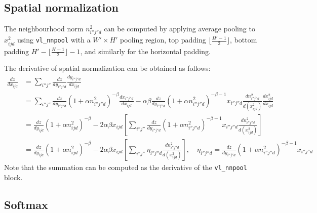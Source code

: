 \subsection{Spatial normalization}\label{s:impl-spnorm}

The neighbourhood norm $n^2_{i''j''d}$ can be computed by applying average pooling to $x_{ijd}^2$ using \verb!vl_nnpool! with a $W'\times H'$ pooling region, top padding $\lfloor \frac{H'-1}{2}\rfloor$, bottom padding $H'-\lfloor \frac{H-1}{2}\rfloor-1$, and similarly for the horizontal padding.

The derivative of spatial normalization can be obtained as follows:
\begin{align*}
\frac{dz}{dx_{ijd}} 
&= \sum_{i''j''}
\frac{dz}{d y_{i''j''d}} 
\frac{d y_{i''j''d}}{d x_{ijd}}
\\
&=
\sum_{i''j''}
\frac{dz}{d y_{i''j''d}} 
(1 + \alpha n_{i''j''d}^2)^{-\beta}
\frac{dx_{i''j''d}}{d x_{ijd}} 
-\alpha\beta
\frac{dz}{d y_{i''j''d}} 
(1 + \alpha n_{i''j''d}^2)^{-\beta-1}
x_{i''j''d}
\frac{dn_{i''j''d}^2}{d (x^2_{ijd})} 
\frac{dx^2_{ijd}}{d x_{ijd}}
\\
&=
\frac{dz}{d y_{ijd}} 
(1 + \alpha n_{ijd}^2)^{-\beta}
-2\alpha\beta x_{ijd}
\left[
\sum_{i''j''}
\frac{dz}{d y_{i''j''d}} 
(1 + \alpha n_{i''j''d}^2)^{-\beta-1}
x_{i''j''d}
\frac{dn_{i''j''d}^2}{d (x_{ijd}^2)}
\right]
\\
&=
\frac{dz}{d y_{ijd}} 
(1 + \alpha n_{ijd}^2)^{-\beta}
-2\alpha\beta x_{ijd}
\left[
\sum_{i''j''}
\eta_{i''j''d}
\frac{dn_{i''j''d}^2}{d (x_{ijd}^2)}
\right],
\quad
\eta_{i''j''d}=
\frac{dz}{d y_{i''j''d}} 
(1 + \alpha n_{i''j''d}^2)^{-\beta-1}
x_{i''j''d}
\end{align*}
Note that the summation can be computed as the derivative of the
\verb!vl_nnpool! block.

\subsection{Softmax}\label{s:impl-softmax}

